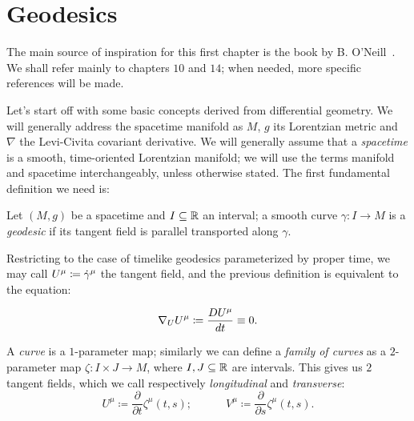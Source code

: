 \section{Geodesics}

\label{sec:geodesics}

The main source of inspiration for this first chapter is the book by B. O'Neill~\cite{o1983semi}. We shall refer mainly to chapters \(10\) and \(14\); when needed, more specific references will be made.

Let's start off with some basic concepts derived from differential geometry. We will generally address the spacetime manifold as \(M\), \(g\) its Lorentzian metric and \(\nabla\) the Levi-Civita covariant derivative.
We will generally assume that a \emph{spacetime} is a smooth, time-oriented Lorentzian manifold; we will use the terms manifold and spacetime interchangeably, unless otherwise stated.
The first fundamental definition we need is:
\begin{definition}
	Let \((M, g)\) be a spacetime and \(I \subseteq {\mathbb{R}}\) an interval; a smooth curve \(\gamma : I \rightarrow M\) is a \emph{geodesic} if its tangent field is parallel transported along \(\gamma\).
\end{definition}    


Restricting to the case of timelike geodesics parameterized by proper time, we may call \(U\indices{^{\mu}} \coloneqq \dot{\gamma}^{\mu}\) the tangent field, and the previous definition is equivalent to the equation:

\begin{equation}
\label{eq:tang-trans-fields}
\nabla_U U^{\mu} \coloneqq \frac{D\tensor{U}{^\mu} }{dt} \equiv 0.
\end{equation}



A \emph{curve} is a \(1\)-parameter map; similarly we can define a \emph{family of curves} as a \(2\)-parameter map \(\zeta: I \times J \rightarrow M\), where \(I, J \subseteq {\mathbb{R}}\) are intervals. This gives us \(2\) tangent fields, which we call respectively \emph{longitudinal} and \emph{transverse}:
\[
U^{\mu} \coloneqq \frac{\partial}{\partial t} \zeta^{\mu}(t,s); \quad \quad \quad 
V^{\mu} \coloneqq \frac{\partial}{\partial s} \zeta^{\mu}(t,s). 
\]

